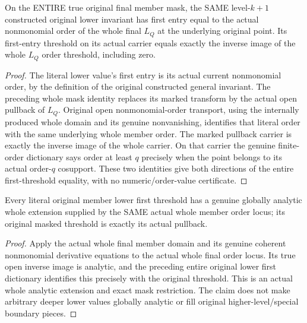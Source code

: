 \begin{theorem}
\label{hir:original-whole-member-literal-lower-first-dictionary}
\leanok
{}
On the ENTIRE true original final member mask, the SAME level-$k+1$
constructed original lower invariant has first entry equal to the actual
nonmonomial order of the whole final $L_Q$ at the underlying original
point. Its first-entry threshold on its actual carrier equals exactly
the inverse image of the whole $L_Q$ order threshold, including zero.
\end{theorem}
\begin{proof}
The literal lower value's first entry is its actual current nonmonomial
order, by the definition of the original constructed general invariant.
The preceding whole mask identity replaces its marked transform by the
actual open pullback of $L_Q$. Original open nonmonomial-order transport,
using the internally produced whole domain and its genuine nonvanishing,
identifies that literal order with the same underlying whole member order.
The marked pullback carrier is exactly the inverse image of the whole
carrier. On that carrier the genuine finite-order dictionary says order
at least $q$ precisely when the point belongs to its actual order-$q$
cosupport. These two identities give both directions of the entire
first-threshold equality, with no numeric/order-value certificate.
\end{proof}

\begin{corollary}
\label{hir:original-whole-member-literal-lower-first-analytic-extension}
\leanok
{}
Every literal original member lower first threshold has a genuine globally
analytic whole extension supplied by the SAME actual whole member order
locus; its original masked threshold is exactly its actual pullback.
\end{corollary}
\begin{proof}
Apply the actual whole final member domain and its genuine coherent
nonmonomial derivative equations to the actual whole final order locus. Its true
open inverse image is analytic, and the preceding entire original lower
first dictionary identifies this precisely with the original threshold.
This is an actual whole analytic extension and exact mask restriction.
The claim does not make arbitrary deeper lower values globally analytic
or fill original higher-level/special boundary pieces.
\end{proof}

